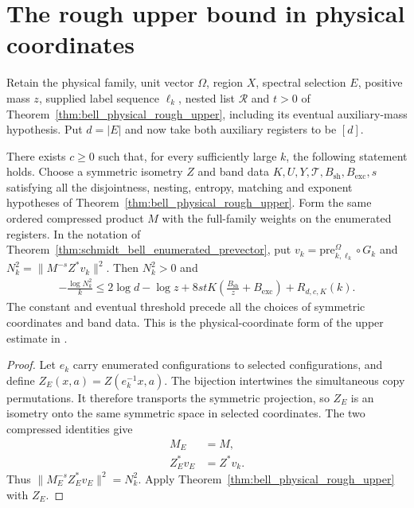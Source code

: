 \section{The rough upper bound in physical coordinates}

\begin{theorem}
    \label{thm:replica_prevector_rough_upper}
    \leanok
    Retain the physical family, unit vector $\Omega$, region $X$, spectral
    selection $E$, positive mass $z$, supplied label sequence $\ell_k$,
    nested list $\mathcal R$ and $t>0$ of
    Theorem~\ref{thm:bell_physical_rough_upper}, including its eventual
    auxiliary-mass hypothesis. Put $d=|E|$ and now take both auxiliary
    registers to be $[d]$.

    There exists $c\ge0$ such that, for every sufficiently large $k$, the
    following statement holds. Choose a symmetric isometry $Z$ and band
    data $K,U,Y,\mathcal T,B_{\mathrm{sh}},B_{\mathrm{exc}},s$ satisfying
    all the disjointness, nesting, entropy, matching and exponent
    hypotheses of Theorem~\ref{thm:bell_physical_rough_upper}. Form the
    same ordered compressed product $M$ with the full-family weights on
    the enumerated registers. In the notation of
    Theorem~\ref{thm:schmidt_bell_enumerated_prevector}, put
    $v_k=\mathrm{pre}_{k,\ell_k}^{\Omega}\circ G_k$ and
    $N_k^2=\|M^{-s}Z^*v_k\|^2$. Then $N_k^2>0$ and
    \begin{align*}
        -\frac{\log N_k^2}{k}
        \le 2\log d-\log z
        +8stK\left(\frac{B_{\mathrm{sh}}}{z}+B_{\mathrm{exc}}\right)
        +R_{d,c,K}(k).
    \end{align*}
    The constant and eventual threshold precede all the choices of
    symmetric coordinates and band data. This is the physical-coordinate
    form of the upper estimate in
    \cite[Section~8, lines~130--163 and~332--381]{OpenAI2026AreaLaw}.
\end{theorem}
\begin{proof}
    \leanok
    Let $e_k$ carry enumerated configurations to selected configurations,
    and define $Z_E(x,a)=Z(e_k^{-1}x,a)$. The bijection intertwines the
    simultaneous copy permutations. It therefore transports the symmetric
    projection, so $Z_E$ is an isometry onto the same symmetric space in
    selected coordinates. The two compressed identities give
    \begin{align*}
        M_E      & =M,      \\
        Z_E^*v_E & =Z^*v_k.
    \end{align*}
    Thus $\|M_E^{-s}Z_E^*v_E\|^2=N_k^2$. Apply
    Theorem~\ref{thm:bell_physical_rough_upper} with $Z_E$.
\end{proof}
